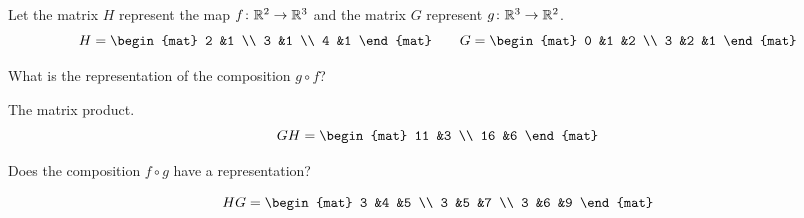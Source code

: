 \documentclass[11pt,answers]{examjh}
\begin{document}
\begin{questions}
\question
Let the matrix $H$ represent the map $\mbox{$f\colon \mathbb{R}^2\to \mathbb{R}^3$}$
and the matrix $G$ represent $\mbox{$g\colon \mathbb{R}^3\to \mathbb{R}^2$}$.
\begin{equation*}
H=
\begin{mat}
2  &1  \\
3  &1  \\
4  &1
\end{mat}
\qquad
G=
\begin{mat}
0  &1 &2  \\
3  &2 &1  
\end{mat}
\end{equation*}
\begin{parts}
\item What is the representation of the composition $g\circ f$?
\begin{solution}[1.25in]
The matrix product.
\begin{equation*}
  GH=
  \begin{mat}
  11 &3 \\
  16 &6
  \end{mat}
\end{equation*}
\end{solution}
\item Does the composition $f\circ g$ have a representation?
\begin{solution}[1.25in]
\begin{equation*}
  HG=
  \begin{mat}
  3 &4 &5 \\
  3 &5 &7 \\
  3 &6 &9
  \end{mat}
\end{equation*}
\end{solution}
\end{parts}

\end{questions}
\end{document}
